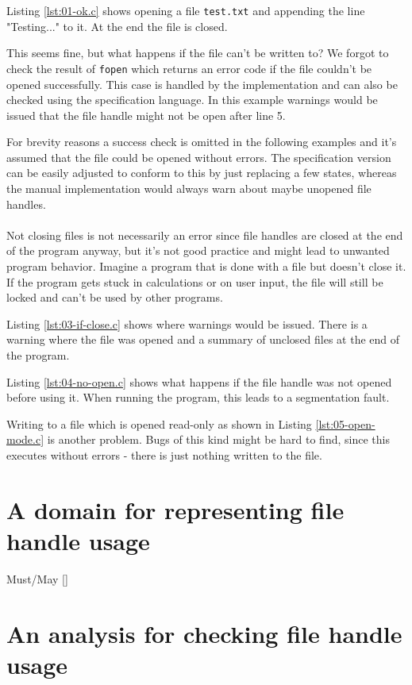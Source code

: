 \documentclass[
fontsize=11pt,paper=a4,
bibliography=totoc, listof=totoc,
headsepline,footsepline,
footinclude=false,BCOR=12mm,DIV=13]{scrbook}
\newcommand{\listingC}[2]
{
  
}
\begin{document}
Listing \ref{lst:01-ok.c} shows opening a file \verb|test.txt| and appending the line "Testing..." to it. At the end the file is closed.
\listingC{01-ok.c}{Everything fine?}
This seems fine, but what happens if the file can't be written to?
We forgot to check the result of \verb|fopen| which returns an error code if the file couldn't be opened successfully.
This case is handled by the implementation and can also be checked using the specification language. In this example warnings would be issued that the file handle might not be open after line 5.

For brevity reasons a success check is omitted in the following examples and it's assumed that the file could be opened without errors. The specification version can be easily adjusted to conform to this by just replacing a few states, whereas the manual implementation would always warn about maybe unopened file handles.
\\\\
Not closing files is not necessarily an error since file handles are closed at the end of the program anyway, but it's not good practice and might lead to unwanted program behavior.
Imagine a program that is done with a file but doesn't close it. If the program gets stuck in calculations or on user input, the file will still be locked and can't be used by other programs.

Listing \ref{lst:03-if-close.c} shows where warnings would be issued. There is a warning where the file was opened and a summary of unclosed files at the end of the program.
\listingC{03-if-close.c}{Missing fclose}

Listing \ref{lst:04-no-open.c} shows what happens if the file handle was not opened before using it. When running the program, this leads to a segmentation fault.
\listingC{04-no-open.c}{Missing fopen}

Writing to a file which is opened read-only as shown in Listing \ref{lst:05-open-mode.c} is another problem. Bugs of this kind might be hard to find, since this executes without errors - there is just nothing written to the file.
\listingC{05-open-mode.c}{Wrong open mode}



\section{A domain for representing file handle usage}
Must/May []

\section{An analysis for checking file handle usage}
\end{document}
